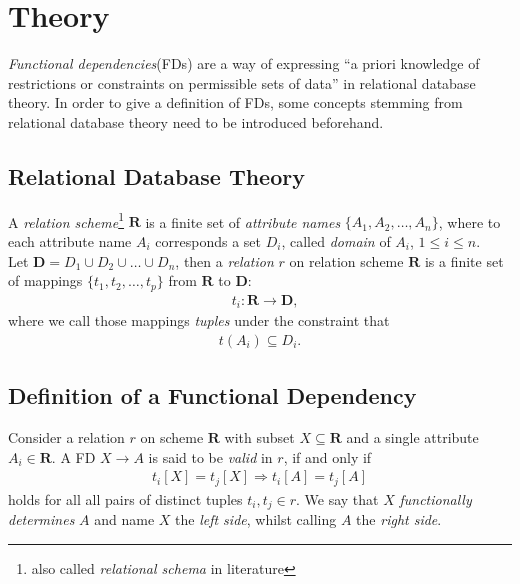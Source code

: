 \newpage
\section{Theory}
\emph{Functional dependencies}(FDs) are a way of expressing ``a priori knowledge of restrictions or constraints on permissible sets of data''\cite[p.42]{MAI83} in relational database theory.
In order to give a definition of FDs, some concepts stemming from relational database theory need to be introduced beforehand.

\subsection{Relational Database Theory}
A \emph{relation scheme}\footnote{also called \emph{relational schema} in literature\cite[p.21]{ABE19} } $\boldsymbol{R}$ is a finite set of \emph{attribute names} $\{A_1, A_2, \dots, A_n\}$, where to each attribute name $A_i$ corresponds a set $D_i$, called \emph{domain} of $A_i$, $1 \leq i \leq n$. \\

Let $\boldsymbol{D} = D_1 \cup D_2 \cup \dots \cup D_n$, then a \emph{relation} $r$ on relation scheme $\boldsymbol{R}$ is a finite set of mappings $\{t_1, t_2, \dots, t_p\}$ from $\boldsymbol{R}$ to $\boldsymbol{D}$:
\begin{align}
  &t_i: \boldsymbol{R} \to \boldsymbol{D},
\end{align}
where we call those mappings \emph{tuples} under the constraint that \cite[p.2]{MAI83}
\begin{align}
  t(A_i) \subseteq D_i.
\end{align}

\subsection{Definition of a Functional Dependency}
Consider a relation $r$ on scheme $\boldsymbol{R}$ with subset $X \subseteq \boldsymbol{R}$ and a single attribute $A_i \in \boldsymbol{R}$.
A FD $X \to A$ is said to be \emph{valid} in $r$, if and only if
\begin{align}\label{eq:fd-condition}
  t_i[X] = t_j[X] \Rightarrow t_i[A] = t_j[A]
\end{align}
holds for all all pairs of distinct tuples $t_i,t_j \in r$.\cite[p.~21]{ABE19} 
We say that $X$ \emph{functionally determines} $A$\cite[p.~43]{MAI83} and name $X$ the \emph{left side}, whilst calling $A$ the \emph{right side}.

